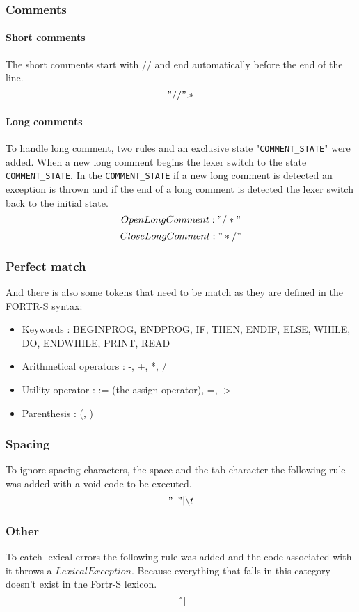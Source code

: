 \documentclass{article}
\begin{document}
\subsubsection{Comments}
\paragraph{Short comments}
The short comments start with // and end automatically before the end of the line.
$$"//".*$$
\paragraph{Long comments}
To handle long comment, two rules and an exclusive state "\texttt{COMMENT\_STATE}" were added. When a new long comment begins the lexer switch to the state \texttt{COMMENT\_STATE}. In the \texttt{COMMENT\_STATE} if a new long comment is detected an exception is thrown and if the end of a long comment is detected the lexer switch back to the initial state.
$$OpenLongComment: "/*"$$
$$CloseLongComment: "*/"$$
\subsubsection{Perfect match}
And there is also some tokens that need to be match as they are defined in the FORTR-S syntax:
    \begin{itemize}
        \item Keywords : BEGINPROG, ENDPROG, IF, THEN, ENDIF, ELSE, WHILE, DO, ENDWHILE, PRINT, READ
        \item Arithmetical operators : -, +, *, /
        \item Utility operator : := (the assign operator), =, $>$
        \item Parenthesis : (, )
    \end{itemize}

\subsubsection{Spacing} To ignore spacing characters, the space and the tab character the following rule was added with a void code to be executed.
    $$"\hspace{5pt} "|\backslash t$$

\subsubsection{Other} To catch lexical errors the following rule was added and the code associated with it throws a $LexicalException$. Because everything that falls in this category doesn't exist in the Fortr-S lexicon.
    $$[\string ^]$$
\end{document}
